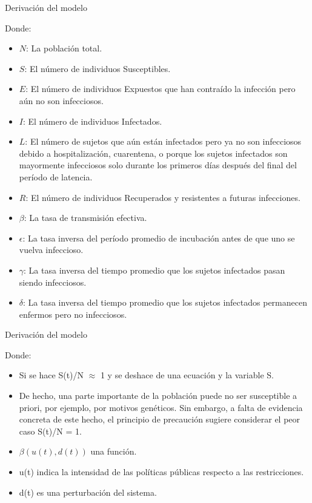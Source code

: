 \documentclass{beamer}
\begin{document}
\begin{frame}{Derivación del modelo}
\begin{justify}
\small
Donde:
{\footnotesize
\begin{itemize}
    \item $N$: La población total.
    \item $S$: El número de individuos Susceptibles.
    \item $E$: El número de individuos Expuestos que han contraído la infección pero aún no son infecciosos.
    \item $I$: El número de individuos Infectados.
    \item $L$: El número de sujetos que aún están infectados pero ya no son infecciosos debido a hospitalización, cuarentena, o porque los sujetos infectados son mayormente infecciosos solo durante los primeros días después del final del período de latencia.
    \item $R$: El número de individuos Recuperados y resistentes a futuras infecciones.
    \item $\beta$: La tasa de transmisión efectiva.
    \item $\epsilon$: La tasa inversa del período promedio de incubación antes de que uno se vuelva infeccioso.
    \item $\gamma$: La tasa inversa del tiempo promedio que los sujetos infectados pasan siendo infecciosos.
    \item $\delta$: La tasa inversa del tiempo promedio que los sujetos infectados permanecen enfermos pero no infecciosos.
\end{itemize}

}
\end{justify}
\end{frame}


\begin{frame}{Derivación del modelo}
\begin{justify}
Donde:
\begin{itemize}
    \item Si se hace S(t)/N $\approx$ 1 y se deshace de una ecuación y la variable S.
    \item De hecho, una parte importante de la población puede no ser susceptible a priori, por ejemplo, por motivos genéticos. Sin embargo, a falta de evidencia concreta de este hecho, el principio de precaución sugiere considerar el peor caso S(t)/N = 1.
    \item  $\beta(u(t), d(t))$ una función.
    \item u(t) indica la intensidad de las políticas públicas respecto a las restricciones.
    \item d(t) es una perturbación del sistema.
\end{itemize}
\end{justify}
\end{frame}
\end{document}
